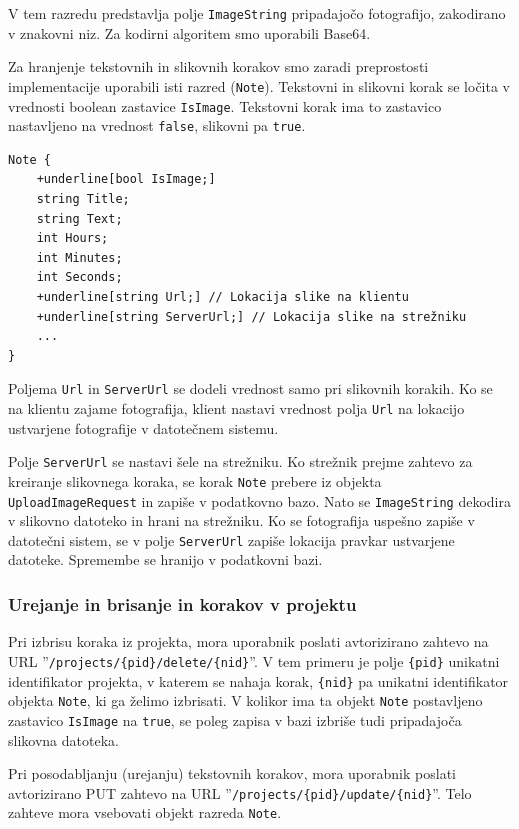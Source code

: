 \documentclass[a4paper, 12pt]{book}
\begin{document}
V tem razredu predstavlja polje \texttt{ImageString} pripadajočo fotografijo, zakodirano v znakovni niz.
Za kodirni algoritem smo uporabili Base64.

Za hranjenje tekstovnih in slikovnih korakov smo zaradi preprostosti implementacije uporabili isti razred (\texttt{Note}).
Tekstovni in slikovni korak se ločita v vrednosti boolean zastavice \texttt{IsImage}.
Tekstovni korak ima to zastavico nastavljeno na vrednost \texttt{false}, slikovni pa \texttt{true}.

\begin{Verbatim}[commandchars=+\[\]]
Note { 
    +underline[bool IsImage;]
    string Title; 
    string Text; 
    int Hours; 
    int Minutes;
    int Seconds; 
    +underline[string Url;] // Lokacija slike na klientu
    +underline[string ServerUrl;] // Lokacija slike na strežniku
    ... 
}
\end{Verbatim}

Poljema \texttt{Url} in \texttt{ServerUrl} se dodeli vrednost samo pri slikovnih korakih.
Ko se na klientu zajame fotografija, klient nastavi vrednost polja \texttt{Url} na lokacijo ustvarjene fotografije v datotečnem sistemu.

Polje \texttt{ServerUrl} se nastavi šele na strežniku.
Ko strežnik prejme zahtevo za kreiranje slikovnega koraka, se korak \texttt{Note} prebere iz objekta \texttt{UploadImageRequest} in zapiše v podatkovno bazo.
Nato se \texttt{ImageString} dekodira v slikovno datoteko in hrani na strežniku.
Ko se fotografija uspešno zapiše v datotečni sistem, se v polje \texttt{ServerUrl} zapiše lokacija pravkar ustvarjene datoteke.
Spremembe se hranijo v podatkovni bazi.

\subsubsection{Urejanje in brisanje in korakov v projektu}

Pri izbrisu koraka iz projekta, mora uporabnik poslati avtorizirano zahtevo na URL ''\texttt{/projects/\{pid\}/delete/\{nid\}}''.
V tem primeru je polje \texttt{\{pid\}} unikatni identifikator projekta, v katerem se nahaja korak, \texttt{\{nid\}} pa unikatni identifikator objekta \texttt{Note}, ki ga želimo izbrisati.
V kolikor ima ta objekt \texttt{Note} postavljeno zastavico \texttt{IsImage} na \texttt{true}, se poleg zapisa v bazi izbriše tudi pripadajoča slikovna datoteka.

Pri posodabljanju (urejanju) tekstovnih korakov, mora uporabnik poslati avtorizirano PUT zahtevo na URL ''\texttt{/projects/\{pid\}/update/\{nid\}}''.
Telo zahteve mora vsebovati objekt razreda \texttt{Note}.
\end{document}
